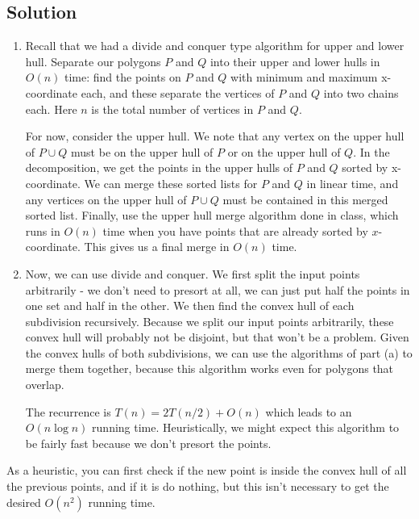 \documentclass{article}
\begin{document}
\subsection*{Solution}
  \begin{enumerate}[label=(\alph*)]
    \item Recall that we had a divide and conquer type algorithm for upper and
      lower hull. Separate our polygons $P$ and $Q$ into their upper and lower
      hulls in $O(n)$ time: find the points on $P$ and $Q$ with minimum
      and maximum x-coordinate each, and these separate the vertices of $P$ and $Q$ into two chains each. Here $n$ is the total number of vertices in $P$ and $Q$. 

\vspace{3mm}
      For now, consider the upper hull. We note that  any vertex on the upper hull of $P \cup Q$ must be on the upper hull of $P$ or on the upper hull of $Q$. In the decomposition, we get the
      points in the upper hulls of $P$ and $Q$ sorted by x-coordinate. 
      We can merge these sorted lists for $P$ and $Q$ in linear time, and any vertices on the upper hull of $P \cup Q$ must be contained in this merged sorted list.
      Finally, use the upper hull merge algorithm done in class, which runs in $O(n)$ time when you have points that are already sorted by $x$-coordinate.
      This gives us a final merge in $O(n)$ time.
      
    \item Now, we can use divide and conquer. We first split the input points
      arbitrarily - we don't need to presort at all, we can just put half the points in one set and half in the other. We then find the convex hull of each subdivision recursively. Because we split our input points arbitrarily, these convex hull will probably not be disjoint, but that won't be a problem. Given the convex hulls of both subdivisions, we can use the algorithms of part (a) to merge them together, because this algorithm works even for polygons that overlap.  

      \vspace{3mm
      }
      The recurrence is $T(n) = 2T(n/2) + O(n)$ which leads to an $O(n\log n)$
      running time. Heuristically, we might expect this algorithm to be fairly fast because we don't presort the points.
  \end{enumerate}
  As a heuristic, you can first check if the new point is inside the convex hull of all the previous points, and if it is do nothing, but this isn't necessary to get the desired $O(n^2)$ running time. 
\end{document}
